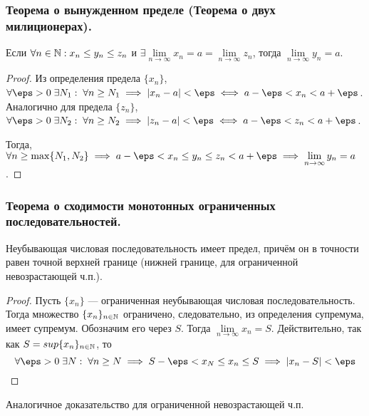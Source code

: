 \documentclass[12pt, a4paper]{article}
\begin{document}
	\subsubsection{Теорема о вынужденном пределе (Теорема о двух милиционерах).}
	\begin{theorem*}
		Если $\forall n \in \mathbb{N}: x_n \leq y_n \leq z_n$ и $\exists \lim\limits_{n \to \infty} x_n = a = \lim\limits_{n \to \infty} z_n$, тогда $\lim\limits_{n \to \infty} y_n = a$.
	\end{theorem*}
	\begin{proof}
		Из определения предела $\{x_n\}$, $\forall \eps > 0 \; \exists N_1: \; \forall n \geq N_1 \implies |x_n - a| < \eps \iff a - \eps < x_n < a + \eps$. Аналогично для предела $\{z_n\}$, $\forall \eps > 0 \; \exists N_2: \; \forall n \geq N_2 \implies |z_n - a| < \eps \iff a - \eps < z_n < a + \eps$. 

		Тогда, 
		$\forall n \geq \max \{N_1, N_2\} \implies a - \eps < x_n \leq y_n \leq z_n < a + \eps \implies \lim\limits_{n \to \infty} y_n = a$.
	\end{proof}

	\subsubsection{Теорема о сходимости монотонных ограниченных последовательностей.}
	\begin{theorem*}
		Неубывающая числовая последовательность имеет предел, причём он в точности равен точной верхней границе (нижней границе, для ограниченной невозрастающей ч.п.).
	\end{theorem*}
	\begin{proof}
		Пусть $\{x_n\}$ --- ограниченная неубывающая числовая последовательность. Тогда множество $\{x_n\}_{n \in \mathbb{N}}$ ограничено, следовательно, из определения супремума, имеет супремум. Обозначим его через $S$. Тогда $\lim\limits_{n \to \infty} x_n = S$. Действительно, так как $S = sup \{x_n\}_{n \in \mathbb{N}}$, то
		\begin{equation*}
			\forall \eps > 0 \; \exists N: \; \forall n \geq N \implies S - \eps < x_N \leq x_n \leq S \implies |x_n - S| < \eps
		\end{equation*}
	\end{proof}
	Аналогичное доказательство для ограниченной невозрастающей ч.п.
\end{document}
